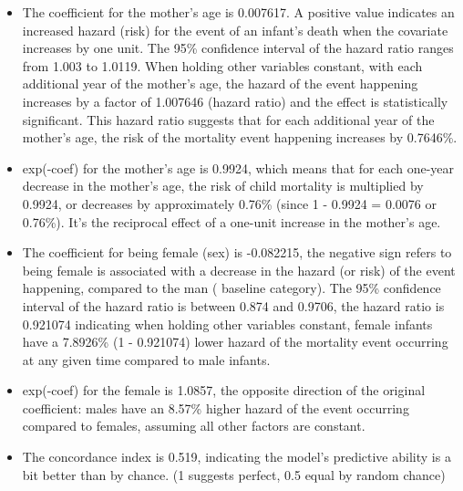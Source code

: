 \documentclass[12pt,letterpaper]{article}
\begin{document}
\vspace{2cm}
\begin{itemize}
    \item The coefficient for the mother's age is 0.007617. A positive value indicates an increased hazard (risk) for the event of an infant's death when the covariate increases by one unit. The 95\% confidence interval of the hazard ratio ranges from 1.003 to 1.0119. When holding other variables constant, with each additional year of the mother's age, the hazard of the event happening increases by a factor of 1.007646 (hazard ratio) and the effect is statistically significant. This hazard ratio suggests that for each additional year of the mother's age, the risk of the mortality event happening increases by 0.7646\%.
    \item exp(-coef) for the mother's age is 0.9924, which means that for each one-year decrease in the mother's age, the risk of child mortality is multiplied by 0.9924, or decreases by approximately 0.76\% (since 1 - 0.9924 = 0.0076 or 0.76\%). It's the reciprocal effect of a one-unit increase in the mother's age.

    \item The coefficient for being female (sex) is -0.082215,  the negative sign refers to being female is associated with a decrease in the hazard (or risk) of the event happening, compared to the man ( baseline category).  The 95\% confidence interval of the hazard ratio is between 0.874 and 0.9706,  the hazard ratio is 0.921074 indicating when holding other variables constant, female infants have a 7.8926\% (1 - 0.921074) lower hazard of the mortality event occurring at any given time compared to male infants.

    \item exp(-coef) for the female is 1.0857,  the opposite direction of the original coefficient: males have an 8.57\% higher hazard of the event occurring compared to females, assuming all other factors are constant. 
    \item The concordance index is 0.519, indicating the model's predictive ability is a bit better than by chance. (1 suggests perfect, 0.5 equal by random chance)
    \end{itemize}
 
\end{document}
